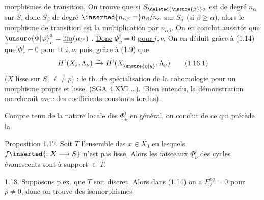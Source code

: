 morphismes de transition,  On trouve que si $S_{\deleted{\unsure{\beta}}\alpha}$ est de degré $n_\alpha$ sur $S$, donc $S_\beta$ de degré $\inserted{n_{\alpha\beta}=}n_\beta/n_\alpha$ sur $S_\alpha$ (si $\beta\geq\alpha$), alors le morphisme de transition est la multiplication par $n_{\alpha\beta}$.  On en conclut aussitôt que $\underline{\unsure{\Phi|\varphi}}^2_\nu=\varinjlim(\mu_{\ell^\nu})$ .  \uline{Donc} $\underline\Phi^i_\nu=0$ \uline{pour  $i,\nu$},   On en déduit grâce à (1.14) que $\Phi^i_\nu=0$ pour tt $i,\nu$, puis, grâce à (1.9) que
\[
H^i(X_s,\Lambda_\nu)\xrightarrow{\sim}H^i(X_{\bar{\unsure{\eta|y}}},\Lambda_\nu)
\tag*{(1.16.1)}
\]
($X$ lisse sur $S$,  $\ell\ne p$) :  le \uline{th. de spécialisation} de la cohomologie pour un morphisme propre et lisse. (SGA 4 $\overline{\underline{\mathrm{XVI}}}$ \dots). [Bien entendu, la  démonstration marcherait avec des coefficients constants tordus).

Compte tenu de la nature locale des $\underline\Phi^i_\nu$ en général, on conclut de ce qui précède la

\uline{Proposition} 1.17. Soit $T$ l'ensemble des $x\in X_0$ en lesquels $f\inserted{:X\longrightarrow S}$ n'est pas lisse,  Alors les faisceaux $\underline\Phi^i_\nu$ des cycles évanescents sont à support $\subset T$.


1.18. Supposons p.ex. que $T$ soit \uline{discret}. Alors dans  (1.14) on a $E_2^{pq}=0$ pour $p\ne0$, donc on trouve des isomorphismes

